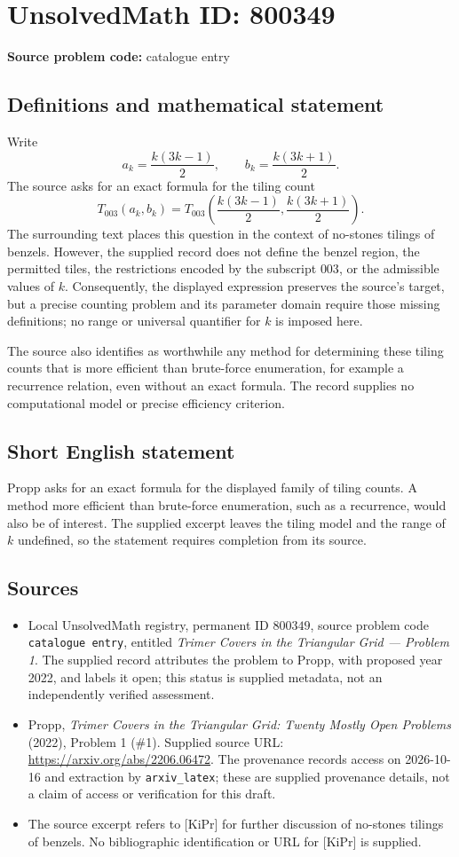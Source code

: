 \documentclass[11pt]{article}
\begin{document}
\section*{UnsolvedMath ID: 800349}
\textbf{Source problem code:} catalogue entry
\subsection{Definitions and mathematical statement}
Write
\[
 a_k=\frac{k(3k-1)}{2},\qquad b_k=\frac{k(3k+1)}{2}.
\]
The source asks for an exact formula for the tiling count
\[
 T_{003}(a_k,b_k)
 =T_{003}\!\left(\frac{k(3k-1)}{2},\frac{k(3k+1)}{2}\right).
\]
The surrounding text places this question in the context of no-stones tilings of benzels. However, the supplied record does not define the benzel region, the permitted tiles, the restrictions encoded by the subscript \(003\), or the admissible values of \(k\). Consequently, the displayed expression preserves the source's target, but a precise counting problem and its parameter domain require those missing definitions; no range or universal quantifier for \(k\) is imposed here.

The source also identifies as worthwhile any method for determining these tiling counts that is more efficient than brute-force enumeration, for example a recurrence relation, even without an exact formula. The record supplies no computational model or precise efficiency criterion.
\subsection{Short English statement}
Propp asks for an exact formula for the displayed family of tiling counts. A method more efficient than brute-force enumeration, such as a recurrence, would also be of interest. The supplied excerpt leaves the tiling model and the range of \(k\) undefined, so the statement requires completion from its source.
\subsection{Sources}
\begin{itemize}
\item Local UnsolvedMath registry, permanent ID \(800349\), source problem code \texttt{catalogue entry}, entitled \emph{Trimer Covers in the Triangular Grid --- Problem 1}. The supplied record attributes the problem to Propp, with proposed year 2022, and labels it open; this status is supplied metadata, not an independently verified assessment.
\item Propp, \emph{Trimer Covers in the Triangular Grid: Twenty Mostly Open Problems} (2022), Problem 1 (\#1). Supplied source URL: \url{https://arxiv.org/abs/2206.06472}. The provenance records access on 2026-10-16 and extraction by \texttt{arxiv\_latex}; these are supplied provenance details, not a claim of access or verification for this draft.
\item The source excerpt refers to [KiPr] for further discussion of no-stones tilings of benzels. No bibliographic identification or URL for [KiPr] is supplied.
\end{itemize}
\end{document}
